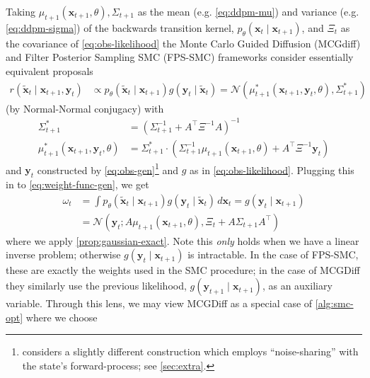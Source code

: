 Taking $\mu_{t+1}(\mathbf{x}_{t+1}, \theta), \Sigma_{t+1}$ as the mean (e.g. \autoref{eq:ddpm-mu}) and
variance (e.g. \autoref{eq:ddpm-sigma}) of the backwards transition kernel,
$p_\theta(\mathbf{x}_t \mid \mathbf{x}_{t+1})$, and $\Xi_t$ as the covariance of
\ref{eq:obs-likelihood} the Monte Carlo Guided Diffusion (MCGdiff)
\parencite{cardosoMonteCarloGuided2023} and Filter Posterior Sampling SMC (FPS-SMC)
\parencite{douDiffusionPosteriorSampling2023} frameworks consider essentially equivalent proposals
\begin{align*}
    r(\tilde{\mathbf{x}}_{t} \mid \mathbf{x}_{t+1}, \mathbf{y}_t) &\propto p_\theta(\tilde{\mathbf{x}}_t \mid \mathbf{x}_{t+1})g(\mathbf{y}_{t} \mid \tilde{\mathbf{x}}_{t})
    = \mathcal{N}(\mu^{*}_{t+1}(\mathbf{x}_{t+1}, \mathbf{y}_t, \theta), \Sigma_{t+1}^{*})
\end{align*}
(by Normal-Normal conjugacy) with
\begin{align*}
    \Sigma_{t+1}^{*} &= \left(\Sigma_{t+1}^{-1} + A^\top \Xi^{-1} A \right)^{-1} \\
    \mu_{t+1}^{*}(\mathbf{x}_{t+1}, \mathbf{y}_t, \theta) &= \Sigma_{t+1}^{*}\cdot\left(\Sigma_{t+1}^{-1}\mu_{t+1}(\mathbf{x}_{t+1}, \theta) + A^\top \Xi^{-1} \mathbf{y}_t \right)
\end{align*}
and $\mathbf{y}_t$ constructed by \autoref{eq:obs-gen}\footnote{
\textcite{douDiffusionPosteriorSampling2023} considers a slightly different construction which
employs ``noise-sharing'' with the state's forward-process; see \ref{sec:extra}.} and $g$ as in
\autoref{eq:obs-likelihood}. Plugging this in to \autoref{eq:weight-func-gen}, we get
\begin{align*}
    \omega_t &= \int p_\theta(\tilde{\mathbf{x}}_t \mid \mathbf{x}_{t+1})g(\mathbf{y}_{t} \mid \tilde{\mathbf{x}}_{t})\, d\mathbf{x}_t
    = g(\mathbf{y}_t \mid \mathbf{x}_{t+1}) \\
    &= \mathcal{N}\left(\mathbf{y}_t; A\mu_{t+1}(\mathbf{x}_{t+1}, \theta), \Xi_t + A\Sigma_{t+1}A^\top\right)
\end{align*}
where we apply \autoref{prop:gaussian-exact}. Note this \emph{only} holds when we have a linear inverse
problem; otherwise $g(\mathbf{y}_t \mid \mathbf{x}_{t+1})$ is intractable. In the case of FPS-SMC,
these are exactly the weights used in the SMC procedure; in the case of MCGDiff they similarly
use the previous likelihood, $g(\mathbf{y}_{t+1} \mid \mathbf{x}_{t+1})$, as an auxiliary variable.
Through this lens, we may view MCGDiff as a special case of \autoref{alg:smc-opt} where we choose
